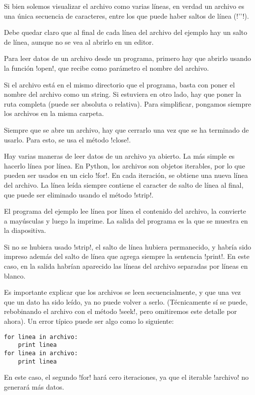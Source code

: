\documentclass[10pt]{article}
\begin{document}
  Si bien solemos visualizar el archivo como varias líneas,
  en verdad un archivo es una única secuencia de caracteres,
  entre los que puede haber saltos de línea (\li!'\n'!).

  Debe quedar claro que al final de cada línea del archivo del ejemplo
  hay un salto de línea, aunque no se vea al abrirlo en un editor.


  Para leer datos de un archivo desde un programa,
  primero hay que abrirlo usando la función \li!open!,
  que recibe como parámetro el nombre del archivo.

  Si el archivo está en el mismo directorio que el programa,
  basta con poner el nombre del archivo como un string.
  Si estuviera en otro lado, hay que poner la ruta completa
  (puede ser absoluta o relativa).
  Para simplificar, pongamos siempre los archivos en la misma carpeta.

  Siempre que se abre un archivo,
  hay que cerrarlo una vez que se ha terminado de usarlo.
  Para esto, se usa el método \li!close!.

  Hay varias maneras de leer datos de un archivo ya abierto.
  La más simple es hacerlo línea por línea.
  En Python, los archivos son objetos iterables,
  por lo que pueden ser usados en un ciclo \li!for!.
  En cada iteración,
  se obtiene una nueva línea del archivo.
  La línea leída siempre contiene el caracter de salto de línea al final,
  que puede ser eliminado usando el método \li!strip!.

  El programa del ejemplo
  lee línea por línea el contenido del archivo,
  la convierte a mayúsculas y luego la imprime.
  La salida del programa es la que se muestra en la diapositiva.

  Si no se hubiera usado \li!strip!,
  el salto de línea hubiera permanecido,
  y habría sido impreso además del salto de línea que agrega siempre
  la sentencia \li!print!.
  En este caso, en la salida habrían aparecido las líneas del archivo
  separadas por líneas en blanco.

  Es importante explicar que los archivos se leen secuencialmente,
  y que una vez que un dato ha sido leído,
  ya no puede volver a serlo.
  (Técnicamente sí se puede, rebobinando el archivo con el método \li!seek!,
  pero omitiremos este detalle por ahora).
  Un error típico puede ser algo como lo siguiente:
\begin{lstlisting}
for linea in archivo:
    print linea
for linea in archivo:
    print linea
\end{lstlisting}
   En este caso, el segundo \li!for! hará cero iteraciones,
   ya que el iterable \li!archivo! no generará más datos.
\end{document}
